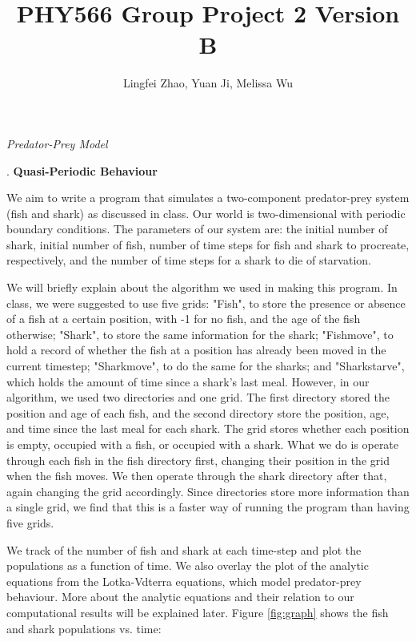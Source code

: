 \documentclass{article}
\begin{document}
\title{PHY566 Group Project 2 Version B}
\author{Lingfei Zhao, Yuan Ji, Melissa Wu}
\maketitle

\begin{center}
\textit{\large Predator-Prey Model}\par
\end{center}
\bigskip
{}. \textbf{Quasi-Periodic Behaviour}\par
\smallskip
We aim to write a program that simulates a two-component predator-prey system (fish and shark) as discussed in class. Our world is two-dimensional with periodic boundary conditions. The parameters of our system are: the initial number of shark, initial number of fish, number of time steps for fish and shark to procreate, respectively, and the number of time steps for a shark to die of starvation.\par
We will briefly explain about the algorithm we used in making this program. In class, we were suggested to use five grids: "Fish", to store the presence or absence of a fish at a certain position, with -1 for no fish, and the age of the fish otherwise; "Shark", to store the same information for the shark; "Fishmove", to hold a record of whether the fish at a position has already been moved in the current timestep; "Sharkmove", to do the same for the sharks; and "Sharkstarve", which holds the amount of time since a shark's last meal. However, in our algorithm, we used two directories and one grid. The first directory stored the position and age of each fish, and the second directory store the position, age, and time since the last meal for each shark. The grid stores whether each position is empty, occupied with a fish, or occupied with a shark. What we do is operate through each fish in the fish directory first, changing their position in the grid when the fish moves. We then operate through the shark directory after that, again changing the grid accordingly. Since directories store more information than a single grid, we find that this is a faster way of running the program than having five grids.\par 
We track of the number of fish and shark at each time-step and plot the populations as a function of time. We also overlay the plot of the analytic equations from the Lotka-Vdterra equations, which model predator-prey behaviour. More about the analytic equations and their relation to our computational results will be explained later. Figure \ref{fig:graph} shows the fish and shark populations vs. time:\par
\end{document}
